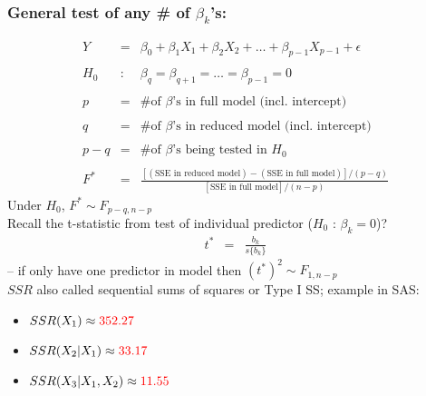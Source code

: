 \documentclass[12pt]{notes}
\begin{document}
\subsubsection*{General test of any \# of $\beta_k$'s:}
\begin{eqnarray}
  Y & = & \beta_0 + \beta_1 X_1 + \beta_2 X_2 + \ldots + \beta_{p-1} X_{p-1} + \epsilon
  \nonumber \\
  & \nonumber \\
  H_0 & : & \beta_q = \beta_{q+1} = \ldots = \beta_{p-1} = 0   \nonumber \\
  & \nonumber \\
  p & = & \mbox{\# of $\beta$'s in full model (incl. intercept)} \nonumber\\
  & \nonumber \\
  q & = & \mbox{\# of $\beta$'s in reduced model (incl. intercept)} \nonumber\\
  & \nonumber \\
  p - q & = & \mbox{\# of $\beta$'s being tested in $H_0$} \nonumber \\
  & \nonumber \\
  F^* & = & \frac{[(\mbox{SSE in reduced model})-(\mbox{SSE in full model})] / (p-q)}{ [\mbox{SSE in full model}] /
  (n-p)} \nonumber
\end{eqnarray}
Under $H_0$, $F^* \sim F_{p-q,n-p}$\\


Recall the t-statistic from test of individual
predictor ($H_0$ : $\beta_k = 0$)?
\begin{eqnarray}
   t^* & = & \frac{b_k}{s\{ b_k \}} \nonumber
\end{eqnarray}
-- if only have one predictor in model then $(t^*)^2 \sim F_{1, n-p}$\\


$SSR$ also called sequential sums of squares or Type I SS; example
in SAS:
\begin{itemize}
  \item $SSR(X_1) \approx {\color{red} 352.27}$
  \item $SSR(X_2 | X_1) \approx {\color{red} 33.17}$
  \item $SSR(X_3 | X_1, X_2) \approx {\color{red} 11.55}$
\end{itemize}

\vspace{.5em}

\end{document}
